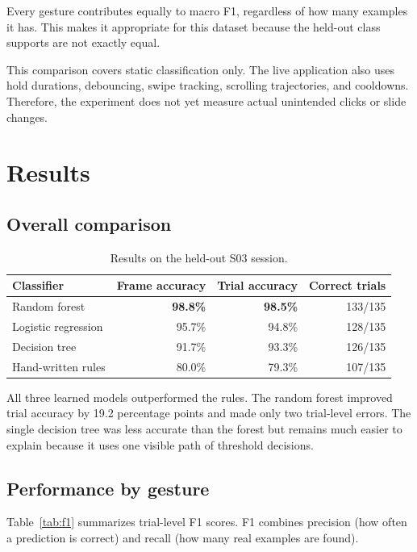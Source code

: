 \documentclass[11pt,a4paper]{article}
\begin{document}
Every gesture contributes equally to macro F1, regardless of how many examples
it has. This makes it appropriate for this dataset because the held-out class
supports are not exactly equal.

This comparison covers static classification only. The live application also
uses hold durations, debouncing, swipe tracking, scrolling trajectories, and
cooldowns. Therefore, the experiment does not yet measure actual unintended
clicks or slide changes.

\section{Results}

\subsection{Overall comparison}

\begin{table}[ht]
\centering
\caption{Results on the held-out S03 session.}
\begin{tabular}{lrrr}
\toprule
Classifier & Frame accuracy & Trial accuracy & Correct trials \\
\midrule
Random forest & \textbf{98.8\%} & \textbf{98.5\%} & 133/135 \\
Logistic regression & 95.7\% & 94.8\% & 128/135 \\
Decision tree & 91.7\% & 93.3\% & 126/135 \\
Hand-written rules & 80.0\% & 79.3\% & 107/135 \\
\bottomrule
\end{tabular}
\end{table}

All three learned models outperformed the rules. The random forest improved
trial accuracy by 19.2 percentage points and made only two trial-level errors.
The single decision tree was less accurate than the forest but remains much
easier to explain because it uses one visible path of threshold decisions.

\subsection{Performance by gesture}

Table~\ref{tab:f1} summarizes trial-level F1 scores. F1 combines precision
(how often a prediction is correct) and recall (how many real examples are
found).
\end{document}

